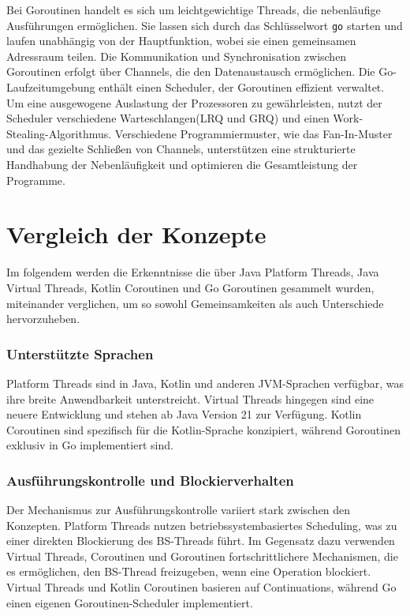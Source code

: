 \documentclass[fontsize=12pt,paper=a4,twoside=semi,parskip=half-,headsepline,headinclude]{scrreprt}
\begin{document}
Bei Goroutinen handelt es sich um leichtgewichtige Threads, die nebenläufige Ausführungen ermöglichen. Sie lassen sich durch das Schlüsselwort \texttt{go} starten und laufen unabhängig von der Hauptfunktion, wobei sie einen gemeinsamen Adressraum teilen. Die Kommunikation und Synchronisation zwischen Goroutinen erfolgt über Channels, die den Datenaustausch ermöglichen. Die Go-Laufzeitumgebung enthält einen Scheduler, der Goroutinen effizient verwaltet. Um eine ausgewogene Auslastung der Prozessoren zu gewährleisten, nutzt der Scheduler verschiedene Warteschlangen(LRQ und GRQ) und einen Work-Stealing-Algorithmus. Verschiedene Programmiermuster, wie das Fan-In-Muster und das gezielte Schließen von Channels, unterstützen eine strukturierte Handhabung der Nebenläufigkeit und optimieren die Gesamtleistung der Programme.

\section{Vergleich der Konzepte}

Im folgendem werden die Erkenntnisse die über Java Platform Threads, Java Virtual Threads, Kotlin Coroutinen und Go Goroutinen gesammelt wurden, miteinander verglichen, um so sowohl Gemeinsamkeiten als auch Unterschiede hervorzuheben.

\subsubsection{Unterstützte Sprachen}

Platform Threads sind in Java, Kotlin und anderen JVM-Sprachen verfügbar, was ihre breite Anwendbarkeit unterstreicht. Virtual Threads hingegen sind eine neuere Entwicklung und stehen ab Java Version 21 zur Verfügung. Kotlin Coroutinen sind spezifisch für die Kotlin-Sprache konzipiert, während Goroutinen exklusiv in Go implementiert sind.

\subsubsection{Ausführungskontrolle und Blockierverhalten}

Der Mechanismus zur Ausführungskontrolle variiert stark zwischen den Konzepten. Platform Threads nutzen betriebssystembasiertes Scheduling, was zu einer direkten Blockierung des BS-Threads führt. Im Gegensatz dazu verwenden Virtual Threads, Coroutinen und Goroutinen fortschrittlichere Mechanismen, die es ermöglichen, den BS-Thread freizugeben, wenn eine Operation blockiert. Virtual Threads und Kotlin Coroutinen basieren auf Continuations, während Go einen eigenen Goroutinen-Scheduler implementiert.
\end{document}
